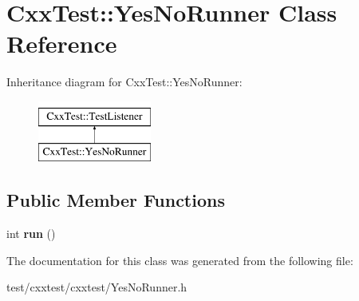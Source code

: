 \hypertarget{classCxxTest_1_1YesNoRunner}{\section{Cxx\-Test\-:\-:Yes\-No\-Runner Class Reference}
\label{classCxxTest_1_1YesNoRunner}
}
Inheritance diagram for Cxx\-Test\-:\-:Yes\-No\-Runner\-:\begin{figure}[H]
\begin{center}
\leavevmode
\includegraphics[height=2.000000cm]{classCxxTest_1_1YesNoRunner}
\end{center}
\end{figure}
\subsection*{Public Member Functions}
\begin{DoxyCompactItemize}
\item 
\hypertarget{classCxxTest_1_1YesNoRunner_a945e3cc8a542b9ff29601e9eaff19507}{int {\bfseries run} ()}\label{classCxxTest_1_1YesNoRunner_a945e3cc8a542b9ff29601e9eaff19507}

\end{DoxyCompactItemize}


The documentation for this class was generated from the following file\-:\begin{DoxyCompactItemize}
\item 
test/cxxtest/cxxtest/Yes\-No\-Runner.\-h\end{DoxyCompactItemize}

